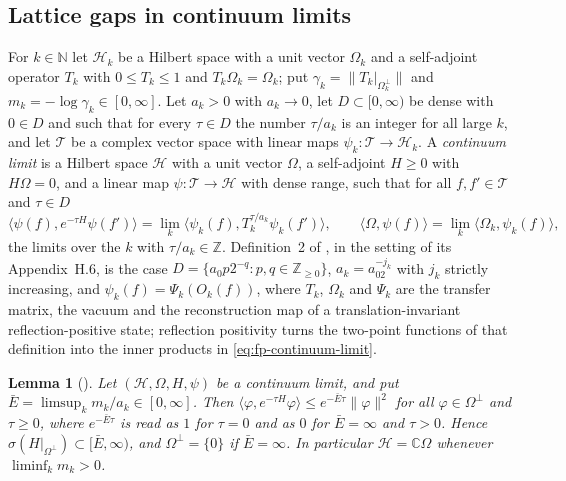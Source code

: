 \documentclass[11pt,a4paper]{amsart}
\newtheorem{lemma}[theorem]{Lemma}
\theoremstyle{definition}
\theoremstyle{remark}
\numberwithin{equation}{section}
\newcommand{\C}{\mathbb{C}}          %
\newcommand{\Z}{\mathbb{Z}}          %
\newcommand{\Nat}{\mathbb{N}}        %
\newcommand{\Hilb}{\mathcal{H}}      %
\newcommand{\ip}[2]{\langle #1,#2\rangle}  %
\newcommand{\norm}[1]{\lVert #1\rVert}     %
\begin{document}
\subsection{Lattice gaps in continuum limits}

For $k\in\Nat$ let $\Hilb_k$ be a Hilbert space with a unit vector $\Omega_k$ and a self-adjoint operator $T_k$ with $0\le T_k\le1$ and $T_k\Omega_k=\Omega_k$; put $\gamma_k=\norm{T_k|_{\Omega_k^\perp}}$ and $m_k=-\log\gamma_k\in[0,\infty]$. Let $a_k>0$ with $a_k\to0$, let $D\subset[0,\infty)$ be dense with $0\in D$ and such that for every $\tau\in D$ the number $\tau/a_k$ is an integer for all large $k$, and let $\mathcal T$ be a complex vector space with linear maps $\psi_k\colon\mathcal T\to\Hilb_k$. A \emph{continuum limit} is a Hilbert space $\Hilb$ with a unit vector $\Omega$, a self-adjoint $H\ge0$ with $H\Omega=0$, and a linear map $\psi\colon\mathcal T\to\Hilb$ with dense range, such that for all $f,f'\in\mathcal T$ and $\tau\in D$
\begin{equation}\label{eq:fp-continuum-limit}
\ip{\psi(f)}{e^{-\tau H}\psi(f')}=\lim_k\ip{\psi_k(f)}{T_k^{\tau/a_k}\psi_k(f')},\qquad \ip{\Omega}{\psi(f)}=\lim_k\ip{\Omega_k}{\psi_k(f)},
\end{equation}
the limits over the $k$ with $\tau/a_k\in\Z$. Definition~2 of \cite{bhattacharjee2026first}, in the setting of its Appendix~H.6, is the case $D=\{a_0p2^{-q}:p,q\in\Z_{\ge0}\}$, $a_k=a_02^{-j_k}$ with $j_k$ strictly increasing, and $\psi_k(f)=\Psi_k(O_k(f))$, where $T_k$, $\Omega_k$ and $\Psi_k$ are the transfer matrix, the vacuum and the reconstruction map of a translation-invariant reflection-positive state; reflection positivity turns the two-point functions of that definition into the inner products in \eqref{eq:fp-continuum-limit}.

\begin{lemma}[{\cite[Lemma~A32]{bhattacharjee2026first}}]\label{lem:fp-continuum-gap}
Let $(\Hilb,\Omega,H,\psi)$ be a continuum limit, and put $\bar E=\limsup_km_k/a_k\in[0,\infty]$. Then $\ip{\varphi}{e^{-\tau H}\varphi}\le e^{-\bar E\tau}\norm{\varphi}^2$ for all $\varphi\in\Omega^\perp$ and $\tau\ge0$, where $e^{-\bar E\tau}$ is read as $1$ for $\tau=0$ and as $0$ for $\bar E=\infty$ and $\tau>0$. Hence $\sigma(H|_{\Omega^\perp})\subset[\bar E,\infty)$, and $\Omega^\perp=\{0\}$ if $\bar E=\infty$. In particular $\Hilb=\C\Omega$ whenever $\liminf_km_k>0$.
\end{lemma}
\end{document}
